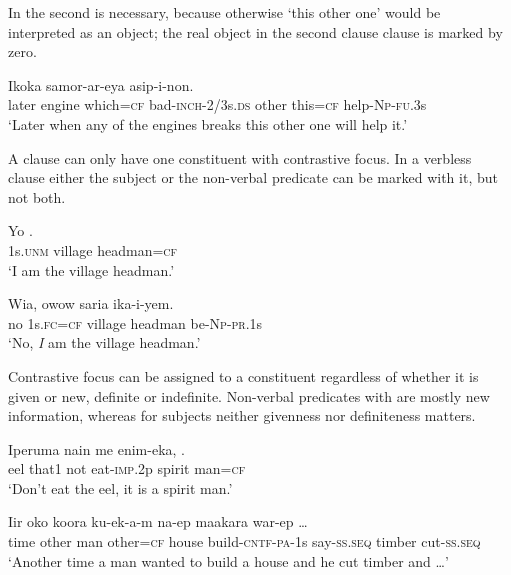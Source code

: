 In  the second  is necessary, because otherwise `this other one' would be interpreted as an object; the real object in the second clause clause is marked by zero.

\ea%
\label{ex:x1706}
\gll Ikoka     samor-ar-eya    asip-i-non.\\
later  engine  which=\textsc{cf}  bad-\textsc{inch}-2/3s.\textsc{ds}  other  this=\textsc{cf} help-\textsc{Np}-\textsc{fu}.3s \\
\glt`Later when any of the engines breaks this other one will help it.'
\z


A clause can only have one constituent with contrastive focus. In a verbless clause  either the subject or the non-verbal predicate can be marked with it, but not both.

\ea%
\label{ex:x1707}
\gll Yo   .\\
1s.\textsc{unm}  village  headman=\textsc{cf}\\
\glt`I am the village headman.'
\z


\ea%
\label{ex:x1708}
\gll Wia,    owow  saria  ika-i-yem. \\
no  1s.\textsc{fc}=\textsc{cf}  village  headman  be-\textsc{Np}-\textsc{pr}.1s      \\
\glt`No, \textit{I} am the village headman.'
\z


Contrastive focus can be assigned to a constituent regardless of whether it is given or new, definite or indefinite. Non-verbal predicates with  are mostly new information, whereas for subjects neither givenness nor definiteness matters.

\ea%
\label{ex:x1709}
\gll Iperuma  nain  me  enim-eka,   .\\
eel  that1  not  eat-\textsc{imp}.2p  spirit  man=\textsc{cf}\\
\glt`Don't eat the eel, it is a spirit man.'
\z


\ea%
\label{ex:x1710}
\gll Iir  oko     koora  ku-ek-a-m  na-ep maakara  war-ep  {\dots}\\
time  other  man  other=\textsc{cf}  house  build-\textsc{cntf}-\textsc{pa}-1s  say-\textsc{ss}.\textsc{seq} timber  cut-\textsc{ss}.\textsc{seq}\\
\glt`Another time a man wanted to build a house and he cut timber and {\dots}'
\z


